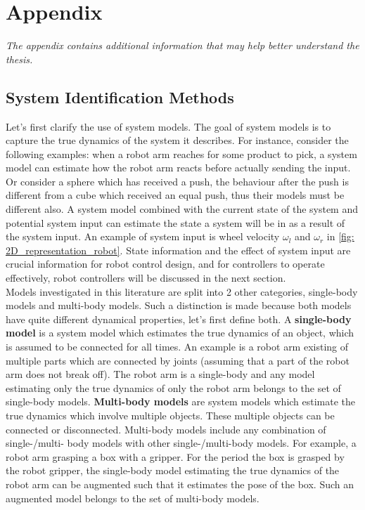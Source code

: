 \chapter{Appendix}%
\label{chap:appendix}

\appendix

\textit{The appendix contains additional information that may help better understand the thesis.\bs}
\newpage

\section{System Identification Methods}


\label{section: system_model_representation}
Let's first clarify the use of system models. The goal of system models is to capture the true dynamics of the system it describes. For instance, consider the following examples: when a robot arm reaches for some product to pick, a system model can estimate how the robot arm reacts before actually sending the input. Or consider a sphere which has received a push, the behaviour after the push is different from a cube which received an equal push, thus their models must be different also. A system model combined with the current state of the system and potential system input can estimate the state a system will be in as a result of the system input. An example of system input is wheel velocity $\omega_l$ and $\omega_r$ in \cref{fig: 2D_representation_robot}. State information and the effect of system input are crucial information for robot control design, and for controllers to operate effectively, robot controllers will be discussed in the next section.\\

Models investigated in this literature are split into 2 other categories, single-body models and multi-body models. Such a distinction is made because both models have quite different dynamical properties, let's first define both. A \textbf{single-body model} is a system model which estimates the true dynamics of an object, which is assumed to be connected for all times. An example is a robot arm existing of multiple parts which are connected by joints (assuming that a part of the robot arm does not break off). The robot arm is a single-body and any model estimating only the true dynamics of only the robot arm belongs to the set of single-body models. \textbf{Multi-body models} are system models which estimate the true dynamics which involve multiple objects. These multiple objects can be connected or disconnected. Multi-body models include any combination of single-/multi- body models with other single-/multi-body models. For example, a robot arm grasping a box with a gripper. For the period the box is grasped by the robot gripper, the single-body model estimating the true dynamics of the robot arm can be augmented such that it estimates the pose of the box. Such an augmented model belongs to the set of multi-body models.\\

